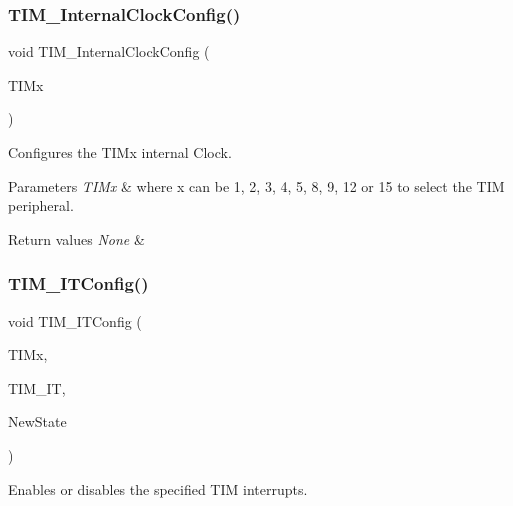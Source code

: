 \subsubsection{\texorpdfstring{TIM\_InternalClockConfig()}{TIM\_InternalClockConfig()}}
{\footnotesize\ttfamily void T\+I\+M\+\_\+\+Internal\+Clock\+Config (\begin{DoxyParamCaption}\item[{\mbox{\hyperlink{struct_t_i_m___type_def}{T\+I\+M\+\_\+\+Type\+Def}} $\ast$}]{T\+I\+Mx }\end{DoxyParamCaption})}



Configures the T\+I\+Mx internal Clock. 


\begin{DoxyParams}{Parameters}
{\em T\+I\+Mx} & where x can be 1, 2, 3, 4, 5, 8, 9, 12 or 15 to select the T\+IM peripheral. \\
\hline
\end{DoxyParams}

\begin{DoxyRetVals}{Return values}
{\em None} & \\
\hline
\end{DoxyRetVals}
\mbox{\label{group___t_i_m___private___functions_ga70e3d6c09d55ee69002e154c85cd40e4}} 
\subsubsection{\texorpdfstring{TIM\_ITConfig()}{TIM\_ITConfig()}}
{\footnotesize\ttfamily void T\+I\+M\+\_\+\+I\+T\+Config (\begin{DoxyParamCaption}\item[{\mbox{\hyperlink{struct_t_i_m___type_def}{T\+I\+M\+\_\+\+Type\+Def}} $\ast$}]{T\+I\+Mx,  }\item[{uint16\+\_\+t}]{T\+I\+M\+\_\+\+IT,  }\item[{\mbox{\hyperlink{group___exported__types_gac9a7e9a35d2513ec15c3b537aaa4fba1}{Functional\+State}}}]{New\+State }\end{DoxyParamCaption})}



Enables or disables the specified T\+IM interrupts. 


